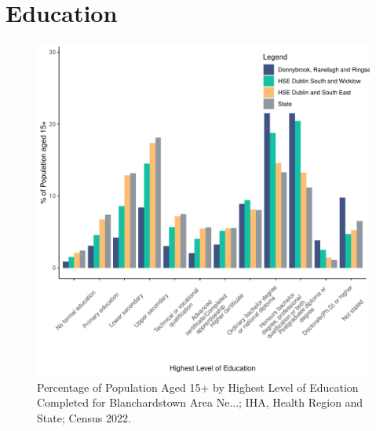 \documentclass{article}
\begin{document}
\section{Education}\label{sect:Edu}
\begin{figure}[H]
	\centering
	\includegraphics[width = 120mm]{../figures/EduED.pdf}
	\caption{Percentage of Population Aged 15+ by Highest Level of Education Completed for Blanchardstown Area Ne...; IHA, Health Region and State; Census 2022.}
	\label{fig:vbnv}
	\end{figure}
\end{document}
